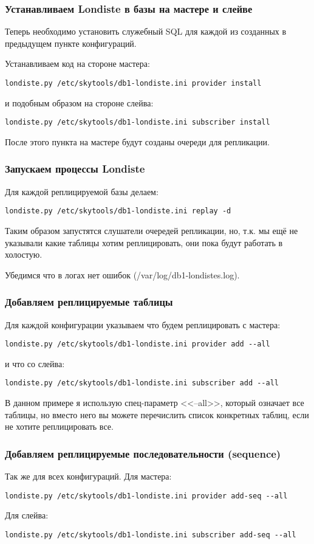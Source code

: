 \subsubsection{Устанавливаем Londiste в базы на мастере и слейве}
Теперь необходимо установить служебный SQL для каждой из созданных в предыдущем
пункте конфигураций.

Устанавливаем код на стороне мастера:
\begin{verbatim}
londiste.py /etc/skytools/db1-londiste.ini provider install
\end{verbatim}
и подобным образом на стороне слейва:
\begin{verbatim}
londiste.py /etc/skytools/db1-londiste.ini subscriber install
\end{verbatim}

После этого пункта на мастере будут созданы очереди для репликации.

\subsubsection{Запускаем процессы Londiste}
Для каждой реплицируемой базы делаем:
\begin{verbatim}
londiste.py /etc/skytools/db1-londiste.ini replay -d
\end{verbatim}

Таким образом запустятся слушатели очередей репликации, но, т.к. мы ещё не
указывали какие таблицы хотим реплицировать, они пока будут работать в холостую.

Убедимся что в логах нет ошибок (/var/log/db1-londistes.log).

\subsubsection{Добавляем реплицируемые таблицы}
Для каждой конфигурации указываем что будем реплицировать с мастера:
\begin{verbatim}
londiste.py /etc/skytools/db1-londiste.ini provider add --all
\end{verbatim}
и что со слейва:
\begin{verbatim}
londiste.py /etc/skytools/db1-londiste.ini subscriber add --all
\end{verbatim}

В данном примере я использую спец-параметр <<--all>>, который означает все таблицы,
но вместо него вы можете перечислить список конкретных таблиц, если не хотите
реплицировать все.

\subsubsection{Добавляем реплицируемые последовательности (sequence)}
Так же для всех конфигураций.
Для мастера:
\begin{verbatim}
londiste.py /etc/skytools/db1-londiste.ini provider add-seq --all
\end{verbatim}
Для слейва:
\begin{verbatim}
londiste.py /etc/skytools/db1-londiste.ini subscriber add-seq --all
\end{verbatim}

